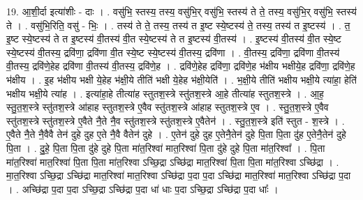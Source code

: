 \documentclass[17pt]{extarticle}
\begin{document}
19. आ॒शी॒र्दा इत्या॑शीः - दाः । . वसु॑भि॒ स्तस्य॒ तस्य॒ वसु॑भि॒र् वसु॑भि॒ स्तस्य॑ ते ते॒ तस्य॒ वसु॑भि॒र् वसु॑भि॒ स्तस्य॑ ते । . वसु॑भि॒रिति॒ वसु॑ - भिः॒ । . तस्य॑ ते ते॒ तस्य॒ तस्य॑ त इ॒ष्ट स्ये॒ष्टस्य॑ ते॒ तस्य॒ तस्य॑ त इ॒ष्टस्य॑ । . त॒ इ॒ष्ट स्ये॒ष्टस्य॑ ते त इ॒ष्टस्य॑ वी॒तस्य॑ वी॒त स्ये॒ष्टस्य॑ ते त इ॒ष्टस्य॑ वी॒तस्य॑ । . इ॒ष्टस्य॑ वी॒तस्य॑ वी॒त स्ये॒ष्ट स्ये॒ष्टस्य॑ वी॒तस्य॒ द्रवि॑णा॒ द्रवि॑णा वी॒त स्ये॒ष्ट स्ये॒ष्टस्य॑ वी॒तस्य॒ द्रवि॑णा । . वी॒तस्य॒ द्रवि॑णा॒ द्रवि॑णा वी॒तस्य॑ वी॒तस्य॒ द्रवि॑णे॒हेह द्रवि॑णा वी॒तस्य॑ वी॒तस्य॒ द्रवि॑णे॒ह । . द्रवि॑णे॒हेह द्रवि॑णा॒ द्रवि॑णे॒ह भ॑क्षीय भक्षीये॒ह द्रवि॑णा॒ द्रवि॑णे॒ह भ॑क्षीय । . इ॒ह भ॑क्षीय भक्षी ये॒हेह भ॑क्षी॒ये तीति॑ भक्षी ये॒हेह भ॑क्षी॒येति॑ । . भ॒क्षी॒ये तीति॑ भक्षीय भक्षी॒ये त्या॑हा॒ हेति॑ भक्षीय भक्षी॒ये त्या॑ह । . इत्या॑हा॒हे तीत्या॑ह स्तुतश॒स्त्रे स्तु॑तश॒स्त्रे आ॒हे तीत्या॑ह स्तुतश॒स्त्रे । . आ॒ह॒ स्तु॒त॒श॒स्त्रे स्तु॑तश॒स्त्रे आ॑हाह स्तुतश॒स्त्रे ए॒वैव स्तु॑तश॒स्त्रे आ॑हाह स्तुतश॒स्त्रे ए॒व । . स्तु॒त॒श॒स्त्रे ए॒वैव स्तु॑तश॒स्त्रे स्तु॑तश॒स्त्रे ए॒वैते नै॒ते नै॒व स्तु॑तश॒स्त्रे स्तु॑तश॒स्त्रे ए॒वैतेन॑ । . स्तु॒त॒श॒स्त्रे इति॑ स्तुत - श॒स्त्रे । . ए॒वैते नै॒ते नै॒वैवै तेन॑ दुहे दुह ए॒ते नै॒वै वैतेन॑ दुहे । . ए॒तेन॑ दुहे दुह ए॒तेनै॒तेन॑ दुहे पि॒ता पि॒ता दु॑ह ए॒तेनै॒तेन॑ दुहे पि॒ता । . दु॒हे॒ पि॒ता पि॒ता दु॑हे दुहे पि॒ता मा॑त॒रिश्वा॑ मात॒रिश्वा॑ पि॒ता दु॑हे दुहे पि॒ता मा॑त॒रिश्वा᳚ । . पि॒ता मा॑त॒रिश्वा॑ मात॒रिश्वा॑ पि॒ता पि॒ता मा॑त॒रिश्वा ऽच्छि॒द्रा ऽच्छि॑द्रा मात॒रिश्वा॑ पि॒ता पि॒ता मा॑त॒रिश्वा ऽच्छि॑द्रा । . मा॒त॒रिश्वा ऽच्छि॒द्रा ऽच्छि॑द्रा मात॒रिश्वा॑ मात॒रिश्वा ऽच्छि॑द्रा प॒दा प॒दा ऽच्छि॑द्रा मात॒रिश्वा॑ मात॒रिश्वा ऽच्छि॑द्रा प॒दा । . अच्छि॑द्रा प॒दा प॒दा ऽच्छि॒द्रा ऽच्छि॑द्रा प॒दा धा॑ धाः प॒दा ऽच्छि॒द्रा ऽच्छि॑द्रा प॒दा धाः᳚ । \newline
\end{document}
